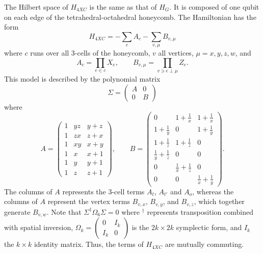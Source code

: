\documentclass[prx,twocolumn,superscriptaddress,nofootinbib,showpacs,notitlepage]{revtex4-2}
\begin{document}
The Hilbert space of $H_{4XC}$ is the same as that of $H_G$. It is composed of one qubit on each edge of the tetrahedral-octahedral honeycomb. The Hamiltonian has the form
\begin{equation}
    H_{4XC}=-\sum_cA_c-\sum_{v,\mu}B_{v,\mu}
\end{equation}
where $c$ runs over all 3-cells of the honeycomb, $v$ all vertices, $\mu=x,y,z,w$, and
\begin{equation}
    A_c=\prod_{e\in c}X_e,\qquad B_{v,\mu}=\prod_{v\ni e\perp\mu}Z_e.
\end{equation}
This model is described by the polynomial matrix
\begin{equation}
    \Sigma=\begin{pmatrix}
    A&0\\0&B
    \end{pmatrix}
\end{equation}
where
\begin{equation}
    A=\begin{pmatrix}
        1 & yz & y+z\\
        1 & zx & z+x \\
        1 & xy & x+y \\
        1 & x & x+1 \\
        1 & y & y+1 \\
        1 & z & z+1
    \end{pmatrix},\qquad
    B=\begin{pmatrix}
        0 & 1+\frac{1}{x} & 1+\frac{1}{x} \\
        1+\frac{1}{y} & 0 & 1+\frac{1}{y} \\
        1+\frac{1}{z} & 1+\frac{1}{z} & 0 \\
        \frac{1}{y}+\frac{1}{z} & 0 & 0 \\
        0 & \frac{1}{x}+\frac{1}{z} & 0 \\
        0 & 0 & \frac{1}{x}+\frac{1}{y}
    \end{pmatrix}.
\end{equation}
The columns of $A$ represents the 3-cell terms $A_t$, $A_{t'}$ and $A_o$, whereas the columns of $A$ represent the vertex terms $B_{v,x}$, $B_{v,y}$, and $B_{v,z}$, which together generate $B_{v,w}$. Note that $\Sigma^\dagger\Omega_6\Sigma=0$ where $^\dagger$ represents transposition combined with spatial inversion, $\Omega_{k}=\begin{pmatrix}
0 & I_k \\
I_k & 0 
\end{pmatrix}$ is the $2k\times 2k$ symplectic form, and $I_k$ the $k\times k$ identity matrix. Thus, the terms of $H_{4XC}$ are mutually commuting.
\end{document}
